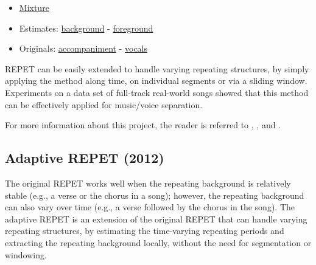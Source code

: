 \documentclass{article}
\begin{document}
\begin{itemize}[noitemsep,topsep=0pt]
\item \href{Audio/REPET/dev1__tamy-que_pena_tanto_faz__snip_6_19__mix.wav}{Mixture}
\item Estimates: \href{Audio/REPET/dev1__tamy-que_pena_tanto_faz__snip_6_19__mix_background.wav}{background} - \href{Audio/REPET/dev1__tamy-que_pena_tanto_faz__snip_6_19__mix_foreground.wav}{foreground}
\item Originals: \href{Audio/REPET/dev1__tamy-que_pena_tanto_faz__snip_6_19__guitar.wav}{accompaniment} - \href{Audio/REPET/dev1__tamy-que_pena_tanto_faz__snip_6_19__vocals.wav}{vocals}
\end{itemize}

REPET can be easily extended to handle varying repeating structures, by simply applying the method along time, on individual segments or via a sliding window. Experiments on a data set of full-track real-world songs showed that this method can be effectively applied for music/voice separation.

For more information about this project, the reader is referred to \cite{inproceedings_rafii_may2011}, \cite{article_rafii_jan2013}, and \cite{inbook_rafii_2014}.


\subsection{Adaptive REPET (2012)}
\label{ssec:repet_adaptive}

The original REPET works well when the repeating background is relatively stable (e.g., a verse or the chorus in a song); however, the repeating background can also vary over time (e.g., a verse followed by the chorus in the song). The adaptive REPET is an extension of the original REPET that can handle varying repeating structures, by estimating the time-varying repeating periods and extracting the repeating background locally, without the need for segmentation or windowing.
\end{document}
